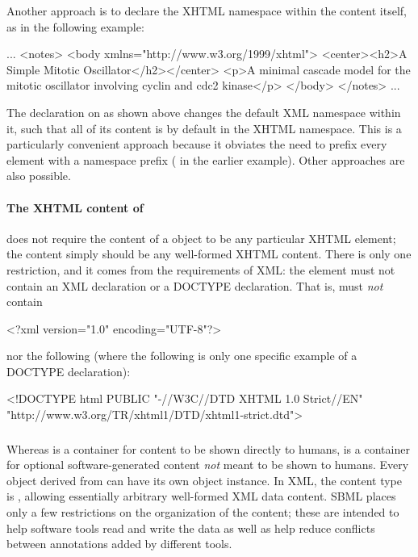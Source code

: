 Another approach is to declare the XHTML namespace within the
 content itself, as in the following example:

\begin{example}
...
<notes>
  <body xmlns="http://www.w3.org/1999/xhtml">
    <center><h2>A Simple Mitotic Oscillator</h2></center>
    <p>A minimal cascade model for the mitotic oscillator
    involving cyclin and cdc2 kinase</p>
  </body>
</notes>
...
\end{example}

The  declaration on
 as shown above changes the default XML namespace
within it, such that all of its content is by default in the XHTML
namespace.  This is a particularly convenient approach because it
obviates the need to prefix every element with a namespace prefix
(\ie {} in the earlier example).  Other
approaches are also possible.


\paragraph{The XHTML content of }

\sbmlthree does not require the content of a \Notes object to be
any particular XHTML element; the content simply should be any
well-formed XHTML content.  There is only one restriction, and it
comes from the requirements of XML: the  element must
not contain an XML declaration or a DOCTYPE declaration.  That
is,  must \emph{not} contain

\begin{example}
<?xml version="1.0" encoding="UTF-8"?>  
\end{example}

nor the following (where the following is only one specific
example of a DOCTYPE declaration):

\begin{example}
<!DOCTYPE html PUBLIC "-//W3C//DTD XHTML 1.0 Strict//EN"
 "http://www.w3.org/TR/xhtml1/DTD/xhtml1-strict.dtd">
\end{example}


\subsubsection{}
\label{sec:annotation-use}
\label{sec:annotations}

Whereas \Notes is a container for content to be shown directly to
humans, \Annotation is a container for optional software-generated
content \emph{not} meant to be shown to humans.  Every object
derived from \SBase can have its own \Annotation object instance.
In XML, the \Annotation content type is , allowing
essentially arbitrary well-formed XML data content.  SBML places
only a few restrictions on the organization of the content; these
are intended to help software tools read and write the data as
well as help reduce conflicts between annotations added by
different tools.


